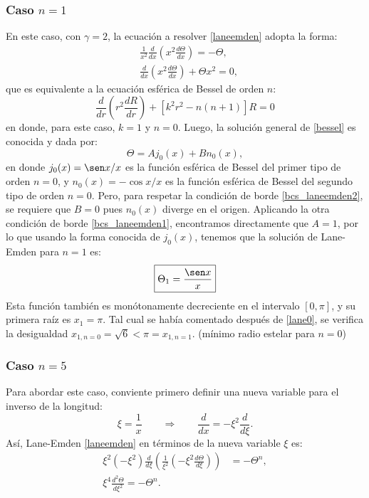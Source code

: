 \subsubsection{Caso \texorpdfstring{$n=1$}{n1}}
En este caso, con $\gamma=2$, la ecuación a resolver \eqref{laneemden} adopta la forma:
\begin{align}
&\frac{1}{x^2}\frac{d}{dx}\left(x^2\frac{d\Theta}{dx}\right)=-\Theta,\\
&\frac{d}{dx}\left(x^2\frac{d\Theta}{dx}\right)+\Theta x^2=0,\label{bessel}
\end{align}
que es equivalente a la ecuación esférica de Bessel de orden $n$:
\begin{equation}
 \frac{d}{dr}\left(r^2\frac{dR}{dr}\right)+\left[k^2 r^2-n(n+1)\right]R=0
\end{equation}
en donde, para este caso, $k=1$ y $n=0$. Luego, la solución general de \eqref{bessel} es conocida y dada por:
\begin{equation}
 \Theta=Aj_0(x)+Bn_0(x),
\end{equation}
en donde $j_0(x)=\sen x/x$ es la función esférica de Bessel del primer tipo de orden $n=0$, y $n_0(x)=-\cos x/x$ es la función esférica de Bessel del segundo tipo de orden $n=0$. Pero, para respetar la condición de borde \eqref{bcs_laneemden2}, se requiere que  $B=0$ pues $n_0(x)$ diverge en el origen. Aplicando la otra condición de borde \eqref{bcs_laneemden1}, encontramos directamente que $A=1$, por lo que usando la forma conocida de $j_0(x)$, tenemos que la solución de Lane-Emden para $n=1$ es:
\begin{equation}\label{lane1}
 \boxed{\Theta_1=\frac{\sen x}{x}}
\end{equation}
Esta función también es monótonamente decreciente en el intervalo $[0,\pi]$, y su primera raíz es $x_1=\pi$. Tal cual se había comentado después de \eqref{lane0}, se verifica la desigualdad $x_{1,n=0}=\sqrt{6}<\pi=x_{1,n=1}.$ (mínimo radio estelar para $n=0$)


\subsubsection{Caso \texorpdfstring{$n=5$}{n5}}\label{sec:exactas-n5}
Para abordar este caso, conviente primero definir una nueva variable para el inverso de la longitud:
\begin{equation}\label{lane5cambio}
 \xi=\frac{1}{x}\qquad\Rightarrow\qquad \frac{d}{d x}=-\xi^2\frac{d}{d\xi}.
\end{equation}
Así, Lane-Emden \eqref{laneemden} en términos de la nueva variable $\xi$ es:
\begin{align}
\xi^2(-\xi^2)\frac{d}{d\xi}\left(\frac{1}{\xi^2}(-\xi^2\frac{d\Theta}{d\xi})\right)&=-\Theta^n, \\
\xi^4\frac{d^2\Theta}{d\xi^2}=-\Theta^n.\label{transkelvin}
\end{align}

